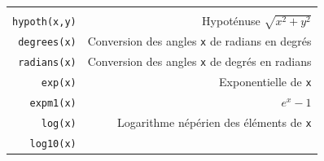 \documentclass[12pt,]{book}
\numberwithin{equation}{section}
\numberwithin{countremarque}{section}
\begin{document}
\begin{longtable}[]{@{}rr@{}}
\begin{minipage}[t]{0.71\columnwidth}
\end{minipage}\tabularnewline
\begin{minipage}[t]{0.18\columnwidth}\raggedleft\strut
\texttt{hypoth(x,y)}\strut
\end{minipage} & \begin{minipage}[t]{0.71\columnwidth}\raggedleft\strut
Hypoténuse \(\sqrt{x^2+y^2}\)\strut
\end{minipage}\tabularnewline
\begin{minipage}[t]{0.18\columnwidth}\raggedleft\strut
\texttt{degrees(x)}\strut
\end{minipage} & \begin{minipage}[t]{0.71\columnwidth}\raggedleft\strut
Conversion des angles \texttt{x} de radians en degrés\strut
\end{minipage}\tabularnewline
\begin{minipage}[t]{0.18\columnwidth}\raggedleft\strut
\texttt{radians(x)}\strut
\end{minipage} & \begin{minipage}[t]{0.71\columnwidth}\raggedleft\strut
Conversion des angles \texttt{x} de degrés en radians\strut
\end{minipage}\tabularnewline
\begin{minipage}[t]{0.18\columnwidth}\raggedleft\strut
\texttt{exp(x)}\strut
\end{minipage} & \begin{minipage}[t]{0.71\columnwidth}\raggedleft\strut
Exponentielle de \texttt{x}\strut
\end{minipage}\tabularnewline
\begin{minipage}[t]{0.18\columnwidth}\raggedleft\strut
\texttt{expm1(x)}\strut
\end{minipage} & \begin{minipage}[t]{0.71\columnwidth}\raggedleft\strut
\(e^x-1\)\strut
\end{minipage}\tabularnewline
\begin{minipage}[t]{0.18\columnwidth}\raggedleft\strut
\texttt{log(x)}\strut
\end{minipage} & \begin{minipage}[t]{0.71\columnwidth}\raggedleft\strut
Logarithme népérien des éléments de \texttt{x}\strut
\end{minipage}\tabularnewline
\begin{minipage}[t]{0.18\columnwidth}\raggedleft\strut
\texttt{log10(x)}\strut
\end{minipage} & \begin{minipage}[t]{0.71\columnwidth}\raggedleft\strut

\end{minipage}
\end{longtable}
\end{document}
